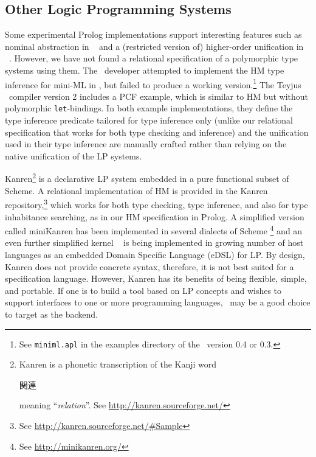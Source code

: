 \subsection{Other Logic Programming Systems}\label{ssec:otherLP}
Some experimental Prolog implementations support interesting features such as
nominal abstraction in \aProlog\ \cite{cheney04iclp} and a (restricted version
of) higher-order unification in \lProlog\ \cite{nadathur99cade}. However, we
have not found a relational specification of a polymorphic type systems using
them. The \aProlog\ developer attempted to implement the HM type inference for
mini-ML in \aProlog, but failed to produce a working version.\footnote{
	See \texttt{miniml.apl} in the examples directory of
	the \aProlog\ version 0.4 or 0.3.}
The Teyjus \lProlog\ compiler version 2 includes a PCF \cite{Scott69} example,
which is similar to HM but without polymorphic \texttt{let}-bindings.
In both example implementations, they define the type inference predicate
tailored for type inference only (unlike our relational specification that
works for both type checking and inference) and the unification used in
their type inference are manually crafted rather than relying on
the native unification of the LP systems.

Kanren\footnote{ Kanren is a phonetic transcription of the Kanji word
	\begin{CJK}{UTF8}{min}{関連}\end{CJK} meaning ``\emph{relation}''.
	See \url{http://kanren.sourceforge.net/} } \cite{ReasonedSchemer}
is a declarative LP system embedded in a pure functional subset of Scheme.
A relational implementation of HM is provided in
the Kanren repository,\footnote{See \url{http://kanren.sourceforge.net/\#Sample}}
which works for both type checking, type inference, and also for
type inhabitance searching, as in our HM specification in Prolog.
A simplified version called miniKanren \cite{minikanrenThesis} has been
implemented in several dialects of Scheme
\footnote{See \url{http://minikanren.org/} }
and an even further simplified kernel \muKanren\ \cite{microKanren}
is being implemented in growing number of host languages as
an embedded Domain Specific Language (eDSL) for LP. By design, Kanren
does not provide concrete syntax, therefore, it is not best suited for
a specification language. However, Kanren has its benefits of being
flexible, simple, and portable. If one is to build a tool based on LP concepts
and wishes to support interfaces to one or more programming languages,
\muKanren\ may be a good choice to target as the backend.


